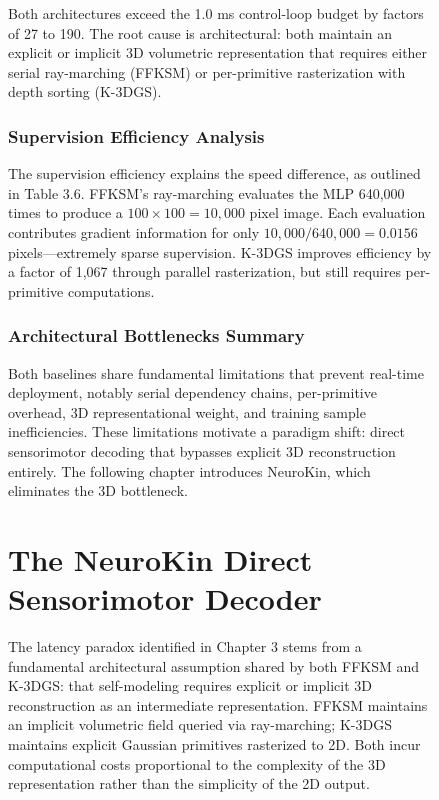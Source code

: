 \documentclass[12pt,a4paper,oneside]{report}
\begin{document}
\begin{figure}[H]
Both architectures exceed the 1.0 ms control-loop budget by factors of 27 to 190. The root cause is architectural: both maintain an explicit or implicit 3D volumetric representation that requires either serial ray-marching (FFKSM) or per-primitive rasterization with depth sorting (K-3DGS).

\subsection{Supervision Efficiency Analysis}

The supervision efficiency explains the speed difference, as outlined in Table 3.6. FFKSM's ray-marching evaluates the MLP 640,000 times to produce a $100 \times 100 = 10,000$ pixel image. Each evaluation contributes gradient information for only $10,000 / 640,000 = 0.0156$ pixels---extremely sparse supervision. K-3DGS improves efficiency by a factor of 1,067 through parallel rasterization, but still requires per-primitive computations.

\subsection{Architectural Bottlenecks Summary}

Both baselines share fundamental limitations that prevent real-time deployment, notably serial dependency chains, per-primitive overhead, 3D representational weight, and training sample inefficiencies. These limitations motivate a paradigm shift: direct sensorimotor decoding that bypasses explicit 3D reconstruction entirely. The following chapter introduces NeuroKin, which eliminates the 3D bottleneck.
\clearpage

\chapter{The NeuroKin Direct Sensorimotor Decoder}
\label{chap:neurokin_decoder_ch4}

The latency paradox identified in Chapter 3 stems from a fundamental architectural assumption shared by both FFKSM and K-3DGS: that self-modeling requires explicit or implicit 3D reconstruction as an intermediate representation. FFKSM maintains an implicit volumetric field queried via ray-marching; K-3DGS maintains explicit Gaussian primitives rasterized to 2D. Both incur computational costs proportional to the complexity of the 3D representation rather than the simplicity of the 2D output.


\end{figure}
\end{document}
